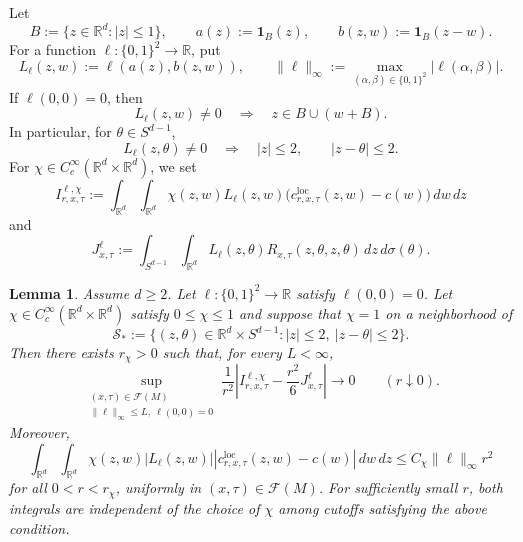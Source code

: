 \documentclass[11pt]{article}
\newtheorem{lemma}[theorem]{Lemma}
\theoremstyle{remark}
\newcommand{\ind}{\mathbf 1}
\numberwithin{equation}{section}
\begin{document}
Let
\[
B:=\{z\in\mathbb R^d:|z|\le1\},
\qquad
a(z):=\ind_B(z),
\qquad
b(z,w):=\ind_B(z-w).
\]
For a function $\ell:\{0,1\}^2\to\mathbb R$, put
\[
L_\ell(z,w):=\ell(a(z),b(z,w)),
\qquad
\|\ell\|_\infty
:=\max_{(\alpha,\beta)\in\{0,1\}^2}
|\ell(\alpha,\beta)|.
\]
If $\ell(0,0)=0$, then
\[
L_\ell(z,w)\ne0
\quad\Longrightarrow\quad
z\in B\cup(w+B).
\]
In particular, for $\theta\in S^{d-1}$,
\[
L_\ell(z,\theta)\ne0
\quad\Longrightarrow\quad
|z|\le2,\qquad |z-\theta|\le2.
\]
For $\chi\in C_c^\infty(\mathbb R^d\times\mathbb R^d)$, we set
\[
I_{r,x,\tau}^{\ell,\chi}
:=
\int_{\mathbb R^d}\int_{\mathbb R^d}
\chi(z,w)L_\ell(z,w)
\bigl(c_{r,x,\tau}^{\mathrm{loc}}(z,w)-c(w)\bigr)
\,dw\,dz
\]
and
\[
J_{x,\tau}^{\ell}
:=
\int_{S^{d-1}}\int_{\mathbb R^d}
L_\ell(z,\theta)
R_{x,\tau}(z,\theta,z,\theta)
\,dz\,d\sigma(\theta).
\]

\begin{lemma}
\label{lem:graph-boundary}
Assume $d\ge2$.  Let
$\ell:\{0,1\}^2\to\mathbb R$ satisfy $\ell(0,0)=0$.
Let $\chi\in C_c^\infty(\mathbb R^d\times\mathbb R^d)$ satisfy
$0\le\chi\le1$ and suppose that $\chi=1$ on a neighborhood of
\[
\mathcal S_*:=
\{(z,\theta)\in\mathbb R^d\times S^{d-1}:
 |z|\le2,\ |z-\theta|\le2\}.
\]
Then there exists $r_\chi>0$ such that, for every $L<\infty$,
\[
\sup_{\substack{(x,\tau)\in\mathcal F(M)\\
\|\ell\|_\infty\le L,\ \ell(0,0)=0}}
\frac{1}{r^2}
\left|
I_{r,x,\tau}^{\ell,\chi}
-\frac{r^2}{6}J_{x,\tau}^{\ell}
\right|
\longrightarrow0
\qquad (r\downarrow0).
\]
Moreover,
\[
\int_{\mathbb R^d}\int_{\mathbb R^d}
\chi(z,w)|L_\ell(z,w)|
\left|
c_{r,x,\tau}^{\mathrm{loc}}(z,w)-c(w)
\right|
\,dw\,dz
\le C_\chi\|\ell\|_\infty r^2
\]
for all $0<r<r_\chi$, uniformly in
$(x,\tau)\in\mathcal F(M)$.
For sufficiently small $r$, both integrals are independent of the
choice of $\chi$ among cutoffs satisfying the above condition.
\end{lemma}
\end{document}
